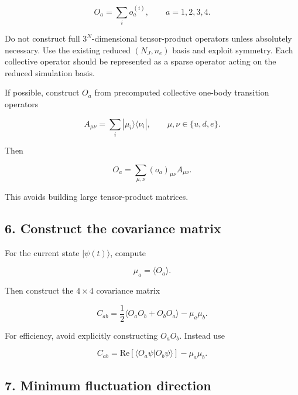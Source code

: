\documentclass[11pt]{article}
\begin{document}
\begin{equation}
O_a = \sum_i o_a^{(i)},
\qquad a=1,2,3,4.
\end{equation}

Do not construct full \(3^N\)-dimensional tensor-product operators unless
absolutely necessary. Use the existing reduced \((N_J,n_e)\) basis and exploit
symmetry. Each collective operator should be represented as a sparse operator
acting on the reduced simulation basis.

If possible, construct \(O_a\) from precomputed collective one-body transition
operators

\begin{equation}
A_{\mu\nu}=\sum_i |\mu_i\rangle\langle \nu_i|,
\qquad
\mu,\nu\in\{u,d,e\}.
\end{equation}

Then

\begin{equation}
O_a =
\sum_{\mu,\nu}
(o_a)_{\mu\nu} A_{\mu\nu}.
\end{equation}

This avoids building large tensor-product matrices.

\subsection*{6. Construct the covariance matrix}

For the current state \(|\psi(t)\rangle\), compute

\begin{equation}
\mu_a = \langle O_a\rangle.
\end{equation}

Then construct the \(4\times4\) covariance matrix

\begin{equation}
C_{ab}
=
\frac{1}{2}
\langle O_aO_b+O_bO_a\rangle
-
\mu_a\mu_b.
\end{equation}

For efficiency, avoid explicitly constructing \(O_aO_b\). Instead use

\begin{equation}
C_{ab}
=
\mathrm{Re}\left[
\langle O_a\psi | O_b\psi\rangle
\right]
-
\mu_a\mu_b.
\end{equation}

\subsection*{7. Minimum fluctuation direction}
\end{document}
